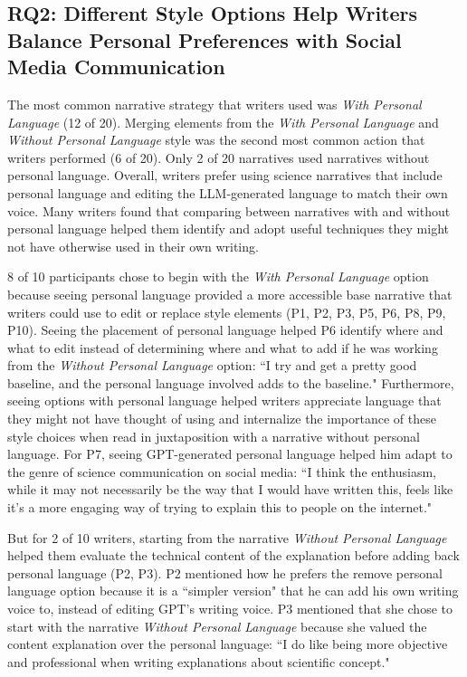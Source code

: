 \subsection{\textbf{RQ2}: Different Style Options Help Writers Balance Personal Preferences with Social Media Communication}
The most common narrative strategy that writers used was \textit{With Personal Language} (12 of 20). Merging elements from the \textit{With Personal Language} and \textit{Without Personal Language} style was the second most common action that writers performed (6 of 20). Only 2 of 20 narratives used narratives without personal language. Overall, writers prefer using science narratives that include personal language and editing the LLM-generated language to match their own voice. Many writers found that comparing between narratives with and without personal language helped them identify and adopt useful techniques they might not have otherwise used in their own writing.

8 of 10 participants chose to begin with the \textit{With Personal Language} option because seeing personal language provided a more accessible base narrative that writers could use to edit or replace style elements (P1, P2, P3, P5, P6, P8, P9, P10). Seeing the placement of personal language helped P6 identify where and what to edit instead of determining where and what to add if he was working from the \textit{Without Personal Language} option: ``I try and get a pretty good baseline, and the personal language involved adds to the baseline." Furthermore, seeing options with personal language helped writers appreciate language that they might not have thought of using and internalize the importance of these style choices when read in juxtaposition with a narrative without personal language. For P7, seeing GPT-generated personal language helped him adapt to the genre of science communication on social media: ``I think the enthusiasm, while it may not necessarily be the way that I would have written this, feels like it's a more engaging way of trying to explain this to people on the internet."

But for 2 of 10 writers, starting from the narrative \textit{Without Personal Language} helped them evaluate the technical content of the explanation before adding back personal language (P2, P3). P2 mentioned how he prefers the remove personal language option because it is a ``simpler version" that he can add his own writing voice to, instead of editing GPT's writing voice. P3 mentioned that she chose to start with the narrative \textit{Without Personal Language} because she valued the content explanation over the personal language: ``I do like being more objective and professional when writing explanations about scientific concept." 


